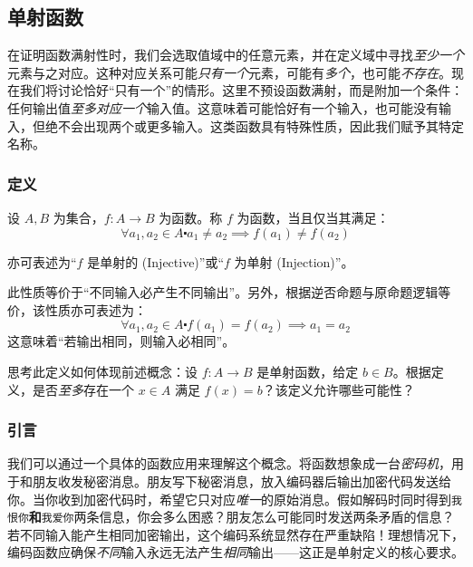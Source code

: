 
\subsection{单射函数}

在证明函数满射性时，我们会选取值域中的任意元素，并在定义域中寻找\emph{至少一个}元素与之对应。这种对应关系可能\emph{只有一个}元素，可能有\emph{多个}，也可能\emph{不存在}。现在我们将讨论恰好``只有一个''的情形。这里不预设函数满射，而是附加一个条件：任何输出值\emph{至多对应一个}输入值。这意味着可能恰好有一个输入，也可能没有输入，但绝不会出现两个或更多输入。这类函数具有特殊性质，因此我们赋予其特定名称。

\subsubsection*{定义}

\begin{definition}
    设 $A, B$ 为集合，$f: A \to B$ 为函数。称 $f$ 为函数，当且仅当其满足：
    \[\forall a_1, a_2 \in A \centerdot a_1 \ne a_2 \implies f(a_1) \ne f(a_2)\]

    亦可表述为``$f$ 是单射的 (Injective)''或``$f$ 为单射 (Injection)''。

    此性质等价于``不同输入必产生不同输出''。另外，根据逆否命题与原命题逻辑等价，该性质亦可表述为：
    \[\forall a_1, a_2 \in A \centerdot f(a_1) = f(a_2) \implies a_1 = a_2\]
    这意味着``若输出相同，则输入必相同''。
\end{definition}

思考此定义如何体现前述概念：设 $f : A \to B$ 是单射函数，给定 $b \in B$。根据定义，是否\emph{至多}存在一个 $x \in A$ 满足 $f(x) = b$？该定义允许哪些可能性？

\subsubsection*{引言}

我们可以通过一个具体的函数应用来理解这个概念。将函数想象成一台\emph{密码机}，用于和朋友收发秘密消息。朋友写下秘密消息，放入编码器后输出加密代码发送给你。当你收到加密代码时，希望它只对应\emph{唯一}的原始消息。假如解码时同时得到\verb|我恨你|\textbf{和}\verb|我爱你|两条信息，你会多么困惑？朋友怎么可能同时发送两条矛盾的信息？若不同输入能产生相同加密输出，这个编码系统显然存在严重缺陷！理想情况下，编码函数应确保\emph{不同}输入永远无法产生\emph{相同}输出——这正是单射定义的核心要求。

